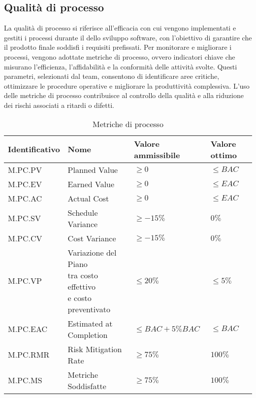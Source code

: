 \subsection{Qualità di processo}
\label{subsec:obiettivi_processo}
La qualità di processo si riferisce all'efficacia con cui vengono implementati e gestiti i processi durante il  dello sviluppo software, 
con l'obiettivo di garantire che il prodotto finale soddisfi i requisiti prefissati. 
Per monitorare e migliorare i processi, vengono adottate metriche di processo, ovvero indicatori chiave che misurano l'efficienza, l'affidabilità 
e la conformità delle attività svolte. 
Questi parametri, selezionati dal team, consentono di identificare aree critiche, ottimizzare le procedure operative e migliorare la produttività complessiva. 
L'uso delle metriche di processo contribuisce al controllo della qualità e alla riduzione dei rischi associati a ritardi o difetti.


\begin{table}[H]
    \centering
    \begin{tabular}{| l | l | l | l |}
    \hline
    \textbf{Identificativo} & 
    \textbf{Nome} &
    \textbf{Valore ammissibile} &
    \textbf{Valore ottimo}\\
    \hline
        M.PC.PV & Planned Value & $\geq 0$ & $\leq BAC$ \\
    \hline
        M.PC.EV & Earned Value & $\geq 0$ & $\leq EAC$ \\
    \hline
        M.PC.AC & Actual Cost & $\geq 0$ & $\leq EAC$ \\
    \hline
        M.PC.SV & Schedule Variance & $\geq -15\%$ & $0\%$ \\
    \hline
        M.PC.CV & Cost Variance & $\geq -15\%$ & $0\%$ \\
    \hline  
        M.PC.VP & \makecell{Variazione del Piano \\ tra costo effettivo \\ e costo preventivato} & $\leq 20\%$ & $\leq 5\%$ \\
    \hline
        M.PC.EAC & Estimated at Completion & $\leq BAC+5\% BAC$ & $\leq BAC$ \\
    \hline
        M.PC.RMR & Risk Mitigation Rate & $\geq 75\%$ & $100\%$ \\
    \hline
        M.PC.MS & Metriche Soddisfatte & $\geq 75\%$ & $100\%$ \\
    \hline
    \end{tabular}
    \caption{Metriche di processo}
    \label{tab:metriche_processo} 
\end{table}